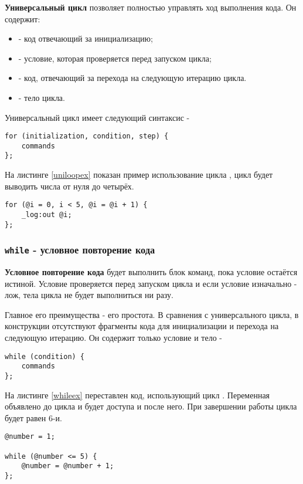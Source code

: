 \documentclass[a4paper, 14pt]{extarticle}
\newenvironment{icItems}
	{ \begin{itemize} [noitemsep,nolistsep] }
	{ \end{itemize} }
\begin{document}
{\bf Универсальный цикл} позволяет полностью управлять ход выполнения кода. Он содержит:

\begin{icItems}
\item
	 - код отвечающий за инициализацию;
\item
	 - условие, которая проверяется перед запуском цикла;
\item
	 - код, отвечающий за перехода на следующую итерацию цикла.
\item
	 - тело цикла.
\end{icItems}

Универсальный цикл имеет следующий синтаксис -
\begin{lstlisting}[numbers=none]
for (initialization, condition, step) {
	commands
};
\end{lstlisting}

На листинге \ref{uniloopex} показан пример использование цикла , цикл будет выводить числа от нуля до четырёх.

\begin{lstlisting}[caption=Универсальный цикл, label=uniloopex]
for (@i = 0, i < 5, @i = @i + 1) {
	_log:out @i;
};
\end{lstlisting}

\subsubsection{\lstinline`while` - условное повторение кода}

{\bf Условное повторение кода} будет выполнить блок команд, пока условие остаётся истиной. Условие проверяется перед запуском цикла и если условие изначально - лож, тела цикла не будет выполниться ни разу.

Главное его преимущества - его простота. В сравнения с универсального цикла, в конструкции  отсутствуют фрагменты кода для инициализации и перехода на следующую итерацию. Он содержит только условие и тело -
\begin{lstlisting}[numbers=none]
while (condition) {
	commands
};
\end{lstlisting}

На листинге \ref{whileex} переставлен код, использующий цикл . Переменная  объявлено до цикла и будет доступа и после него. При завершении работы цикла  будет равен 6-и.

\begin{lstlisting}[caption=Цикл while, label=whileex]
@number = 1;

while (@number <= 5) {
	@number = @number + 1;
};
\end{lstlisting}
\end{document}
